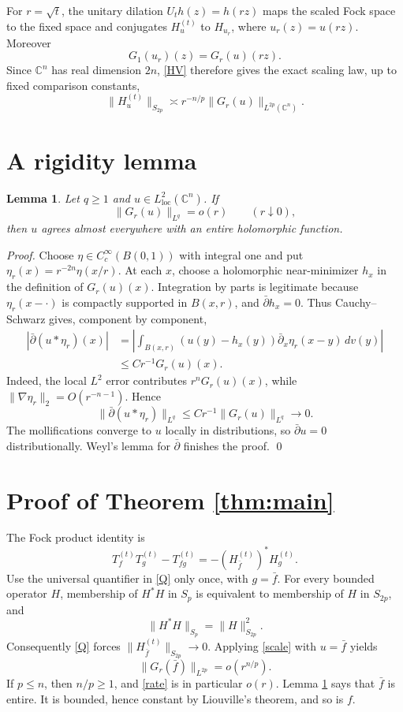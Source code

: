 \documentclass[11pt]{article}
\newtheorem{lemma}{Lemma}
\newcommand{\C}{\mathbb C}
\begin{document}
For $r=\sqrt t$, the unitary dilation
$U_t h(z)=h(rz)$ maps the scaled Fock space to the fixed space and
conjugates $H_u^{(t)}$ to $H_{u_r}$, where $u_r(z)=u(rz)$.  Moreover
\[
 G_1(u_r)(z)=G_r(u)(rz).
\]
Since $\C^n$ has real dimension $2n$, \eqref{HV} therefore gives the exact
scaling law, up to fixed comparison constants,
\begin{equation}\label{scale}
 \|H_u^{(t)}\|_{S_{2p}}
 \asymp r^{-n/p}\|G_r(u)\|_{L^{2p}(\C^n)}.               \tag{1}
\end{equation}

\section*{A rigidity lemma}
\begin{lemma}\label{lem:rigid}
Let $q\ge1$ and $u\in L^2_{\mathrm{loc}}(\C^n)$.  If
\[
 \|G_r(u)\|_{L^q}=o(r)\qquad(r\downarrow0),
\]
then $u$ agrees almost everywhere with an entire holomorphic function.
\end{lemma}

\emph{Proof.}
Choose $\eta\in C_c^\infty(B(0,1))$ with integral one and put
$\eta_r(x)=r^{-2n}\eta(x/r)$.  At each $x$, choose a holomorphic
near-minimizer $h_x$ in the definition of $G_r(u)(x)$.  Integration by
parts is legitimate because $\eta_r(x-\cdot)$ is compactly supported in
$B(x,r)$, and $\bar\partial h_x=0$.  Thus Cauchy--Schwarz gives, component
by component,
\begin{align*}
 |\bar\partial(u*\eta_r)(x)|
 &=\left|\int_{B(x,r)}(u(y)-h_x(y))
       \bar\partial_x\eta_r(x-y)\,dv(y)\right|\\
 &\le C r^{-1}G_r(u)(x).
\end{align*}
Indeed, the local $L^2$ error contributes $r^nG_r(u)(x)$, while
$\|\nabla\eta_r\|_2=O(r^{-n-1})$.  Hence
\[
 \|\bar\partial(u*\eta_r)\|_{L^q}
 \le Cr^{-1}\|G_r(u)\|_{L^q}\longrightarrow0.
\]
The mollifications converge to $u$ locally in distributions, so
$\bar\partial u=0$ distributionally.  Weyl's lemma for $\bar\partial$
finishes the proof. \qed

\section*{Proof of Theorem \ref{thm:main}}
The Fock product identity is
\[
 T_f^{(t)}T_g^{(t)}-T_{fg}^{(t)}
 =-(H_{\bar f}^{(t)})^*H_g^{(t)}.
\]
Use the universal quantifier in \eqref{Q} only once, with $g=\bar f$.
For every bounded operator $H$, membership of $H^*H$ in $S_p$ is
equivalent to membership of $H$ in $S_{2p}$, and
\[
 \|H^*H\|_{S_p}=\|H\|_{S_{2p}}^2.
\]
Consequently \eqref{Q} forces
$\|H_{\bar f}^{(t)}\|_{S_{2p}}\to0$.  Applying \eqref{scale} with
$u=\bar f$ yields
\begin{equation}\label{rate}
 \|G_r(\bar f)\|_{L^{2p}}=o(r^{n/p}).                    \tag{2}
\end{equation}
If $p\le n$, then $n/p\ge1$, and \eqref{rate} is in particular $o(r)$.
Lemma \ref{lem:rigid} says that $\bar f$ is entire.  It is bounded, hence
constant by Liouville's theorem, and so is $f$.
\end{document}
